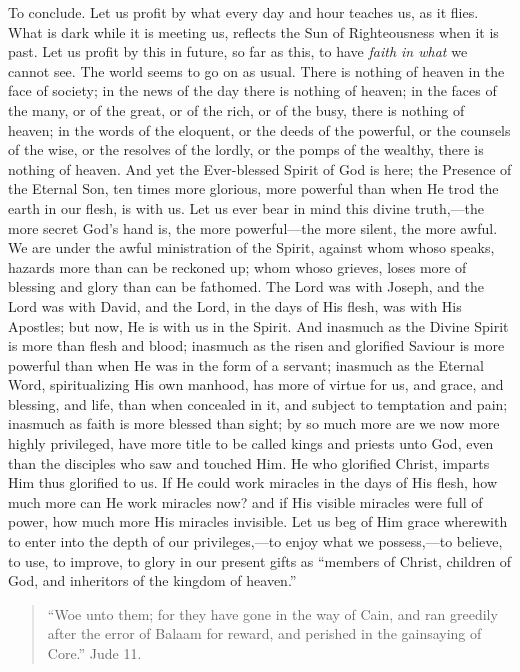 To conclude. Let us profit by what every day and hour teaches us,
as it flies. What is dark while it is meeting us, reflects the Sun of
Righteousness when it is past. Let us profit by this in future, so far
as this, to have \emph{faith in what} we cannot see. The world seems
to go on as usual. There is nothing of heaven in the face of society;
in the news of the day there is nothing of heaven; in the faces of the
many, or of the great, or of the rich, or of the busy, there is
nothing of heaven; in the words of the eloquent, or the deeds of the
powerful, or the counsels of the wise, or the resolves of the lordly,
or the pomps of the wealthy, there is nothing of heaven. And yet the
Ever-blessed Spirit of God is here; the Presence of the Eternal Son,
ten times more glorious, more powerful than when He trod the earth in
our flesh, is with us. Let us ever bear in mind this divine truth,—the
more secret God's hand is, the more powerful—the more silent, the
more awful. We are under the awful ministration of the Spirit, against
whom whoso speaks, hazards more than can be reckoned up; whom whoso
grieves, loses more of blessing and glory than can be fathomed. The
Lord was with Joseph, and the Lord was with David, and the Lord, in
the days of His flesh, was with His Apostles; but now, He is with us
in the Spirit. And inasmuch as the Divine Spirit is more than flesh
and blood; inasmuch as the risen and glorified Saviour is more
powerful than when He was in the form of a servant; inasmuch as the
Eternal Word, spiritualizing His own manhood, has more of virtue for
us, and grace, and blessing, and life, than when concealed in it, and
subject to temptation and pain; inasmuch as faith is more blessed than
sight; by so much more are we now more highly privileged, have more
title to be called kings and priests unto God, even than the disciples
who saw and touched Him. He who glorified Christ, imparts Him thus
glorified to us. If He could work miracles in the days of His flesh,
how much more can He work miracles now? and if His visible miracles
were full of power, how much more His miracles invisible. Let us beg
of Him grace wherewith to enter into the depth of our privileges,—to
enjoy what we possess,—to believe, to use, to improve, to glory in
our present gifts as ``members of Christ, children of God, and
inheritors of the kingdom of heaven.''


\begin{quote}

``Woe unto them; for they have gone in the way of Cain, and
ran greedily after the error of Balaam for reward, and perished in
the gainsaying of Core.'' Jude 11.

\end{quote}

